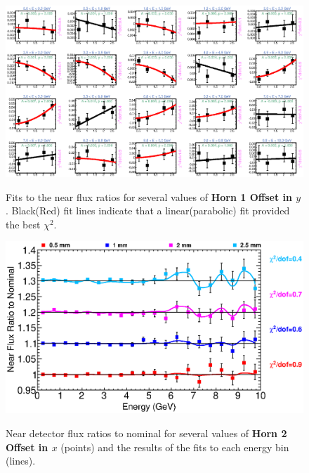 \begin{figure}[ht]
  \begin{center}
    {\includegraphics[width=5.0in]{figures/Horn1YOffset_near_fits.eps}}
  \end{center}
\caption{ Fits to the near flux ratios for several values of {\bf Horn 1 Offset in $y$}. Black(Red) fit lines indicate that a linear(parabolic) fit provided the best $\chi^2$. }
\end{figure}

\begin{figure}[ht]
  \begin{center}
    {\includegraphics[width=6.0in]{figures/Horn2XOffset_near_summary.eps}}
  \end{center}
\caption{ Near detector flux ratios to nominal for several values of {\bf Horn 2 Offset in $x$} (points) and the results of the fits to each energy bin (lines).}
\end{figure}

